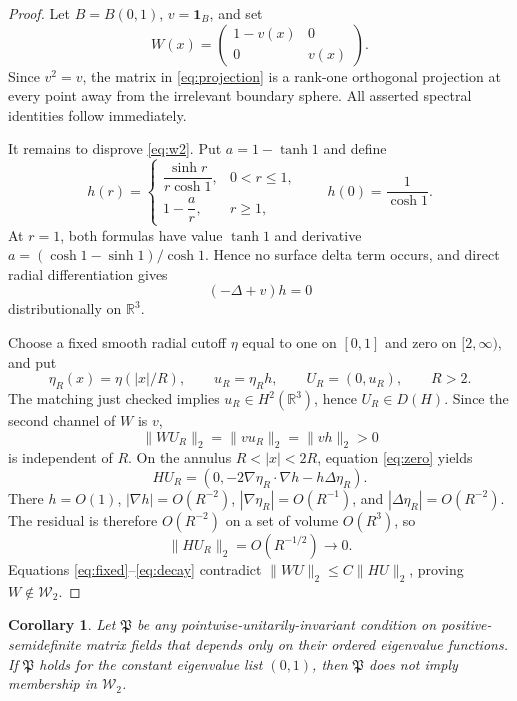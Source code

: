 \documentclass[11pt]{article}
\newtheorem{corollary}{Corollary}
\newcommand{\R}{\mathbb R}
\newcommand{\one}{\mathbf 1}
\newcommand{\Wtwo}{\mathcal W_2}
\begin{document}
\begin{proof}
Let $B=B(0,1)$, $v=\one_B$, and set
\begin{equation}\label{eq:projection}
 W(x)=
 \begin{pmatrix}
  1-v(x)&0\\
  0&v(x)
 \end{pmatrix}.
\end{equation}
Since $v^2=v$, the matrix in \eqref{eq:projection} is a rank-one orthogonal
projection at every point away from the irrelevant boundary sphere.
All asserted spectral identities follow immediately.

It remains to disprove \eqref{eq:w2}. Put $a=1-\tanh1$ and define
\[
 h(r)=
 \begin{cases}
  \dfrac{\sinh r}{r\cosh1},&0<r\le1,\\[6pt]
  1-\dfrac{a}{r},&r\ge1,
 \end{cases}
 \qquad h(0)=\dfrac1{\cosh1}.
\]
At $r=1$, both formulas have value $\tanh1$ and derivative
$a=(\cosh1-\sinh1)/\cosh1$. Hence no surface delta term occurs, and direct
radial differentiation gives
\begin{equation}\label{eq:zero}
 (-\Delta+v)h=0
\end{equation}
distributionally on $\R^3$.

Choose a fixed smooth radial cutoff $\eta$ equal to one on $[0,1]$ and zero
on $[2,\infty)$, and put
\[
 \eta_R(x)=\eta(|x|/R),\qquad
 u_R=\eta_Rh,\qquad U_R=(0,u_R),\qquad R>2.
\]
The matching just checked implies $u_R\in H^2(\R^3)$, hence
$U_R\in D(H)$. Since the second channel of $W$ is $v$,
\begin{equation}\label{eq:fixed}
 \|WU_R\|_2=\|vu_R\|_2=\|vh\|_2>0
\end{equation}
is independent of $R$. On the annulus $R<|x|<2R$, equation
\eqref{eq:zero} yields
\[
 HU_R=
 \left(0,-2\nabla\eta_R\cdot\nabla h-h\Delta\eta_R\right).
\]
There $h=O(1)$, $|\nabla h|=O(R^{-2})$,
$|\nabla\eta_R|=O(R^{-1})$, and
$|\Delta\eta_R|=O(R^{-2})$. The residual is therefore $O(R^{-2})$ on a
set of volume $O(R^3)$, so
\begin{equation}\label{eq:decay}
 \|HU_R\|_2=O(R^{-1/2})\longrightarrow0.
\end{equation}
Equations \eqref{eq:fixed}--\eqref{eq:decay} contradict
$\|WU\|_2\le C\|HU\|_2$, proving $W\notin\Wtwo$.
\end{proof}

\begin{corollary}\label{cor:spectral}
Let $\mathfrak P$ be any pointwise-unitarily-invariant condition on
positive-semidefinite matrix fields that depends only on their ordered
eigenvalue functions. If $\mathfrak P$ holds for the constant eigenvalue list
$(0,1)$, then $\mathfrak P$ does not imply membership in $\Wtwo$.
\end{corollary}
\end{document}
